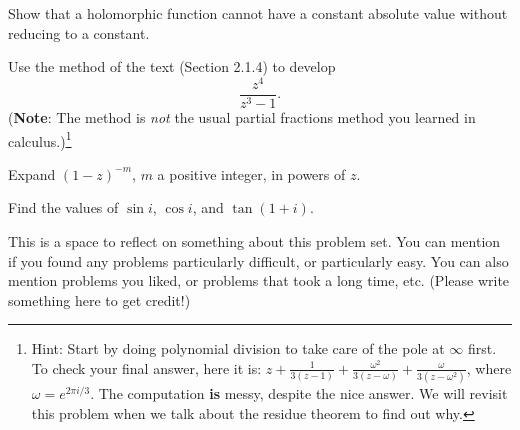 \begin{problem}
  Show that a holomorphic function cannot have a constant absolute value without reducing to a constant.
\end{problem}

\begin{problem}
  Use the method of the text (Section 2.1.4) to develop
  \[\frac{z^4}{z^3-1}.\]
  (\textbf{Note}: The method is \emph{not} the usual partial fractions method you learned in calculus.)\footnote{Hint: Start by doing polynomial division to take care of the pole at $\infty$ first. To check your final answer, here it is: $z+\frac 1{3(z-1)}+\frac{\omega^2}{3(z-\omega)}+\frac{\omega}{3(z-\omega^2)}$, where $\omega=e^{2\pi i/3}$. The computation \textbf{is} messy, despite the nice answer. We will revisit this problem when we talk about the residue theorem to find out why.}
\end{problem}

\begin{problem}
  Expand $(1-z)^{-m}$, $m$ a positive integer, in powers of $z$.
\end{problem}

\begin{problem}
  Find the values of $\sin i$, $\cos i$, and $\tan(1+i)$.
\end{problem}

\begin{problem}
  This is a space to reflect on something about this problem set. You can mention if you found any problems particularly difficult, or particularly easy. You can also mention problems you liked, or problems that took a long time, etc. (Please write something here to get credit!)
\end{problem}
